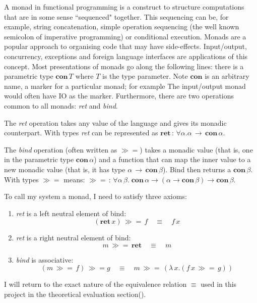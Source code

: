\documentclass[12pt,twoside,notitlepage]{report}
\theoremstyle{plain}%
\theoremstyle{definition}
\theoremstyle{remark}
\begin{document}
\label{sec:monad_second_mention}
A monad\cite{hoareetal2001tackling} in functional programming is a construct to structure computations that are in some sense ``sequenced" together. This sequencing can be, for example, string concatenation, simple operation sequencing (the well known semicolon of imperative programming) or conditional execution. Monads are a popular approach to organising code that may have side-effects. Input/output, concurrency, exceptions and foreign language interfaces are applications of this concept. Most presentations of monads go along the following lines: there is a parametric type $ \textbf{con} \, T $ where $ T $ is the type parameter. Note $ \textbf{con} $ is an arbitrary name, a marker for a particular monad; for example The input/output monad would often have IO as the marker. Furthermore, there are two operations common to all monads: \textit{ret} and \textit{bind}.

The \textit{ret} operation takes any value of the language and gives its monadic counterpart. With types \textit{ret} can be represented as $ \textbf{ret} \, :\, \forall \alpha. \alpha\, \rightarrow\, \textbf{con}\, \alpha $.

The \textit{bind} operation (often written as $ \gg= $)  takes a monadic value (that is, one in the parametric type $ \textbf{con} \, \alpha $) and a function that can map the inner value to a new monadic value (that is, it has type $ \alpha \, \rightarrow \, \textbf{con} \, \beta $). Bind then returns a $ \textbf{con} \, \beta $. With types $ \gg= $ means: $ \gg= \, : \, \forall \alpha \, \beta. \; \textbf{con} \, \alpha \rightarrow (\alpha \rightarrow \textbf{con} \, \beta) \rightarrow \textbf{con} \, \beta $.

To call my system a monad, I need to satisfy three axioms:

\begin{enumerate}
\item{\textit{ret} is a left neutral element of bind:
\[ (\textbf{ret} \, x) \, \gg=\, f \quad \equiv \quad f \, x \]}
\item{\textit{ret} is a right neutral element of bind:
\[ m \, \gg=\, \textbf{ret} \quad \equiv \quad m \]}
\item{\textit{bind} is associative:
\[ (m \, \gg= \, f) \, \gg= g \quad \equiv \quad m\, \gg= \, (\lambda\, x. (f\, x \, \gg= \, g) ) \]}
\end{enumerate}

I will return to the exact nature of the equivalence relation $ \equiv $ used in this project in the theoretical evaluation section(). \label{sec:first_mention_of_equiv}
\end{document}
